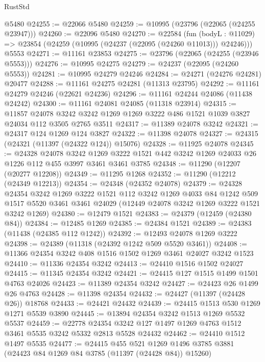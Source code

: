 \begin{lexlean}{RustStd}
\begin{coremodule}
    @5480
@24255 := @22066 @5480
@24259 := @10995 (@23796 (@22065 (@24255 @23947)))
@24260 := @22096 @5480
@24270 := @22584
    (fun (bodyL : @11029) => @23854 (@24259 (@10995 (@24237 (@22095 (@24260 @11013))) @24246)))
    @5553
@24271 := @11161 @23853
@24275 := @23796 (@22065 (@24255 (@23946 @5553)))
@24276 := @10995 @24275
@24279 := @24237 (@22095 (@24260 @5553))
@24281 := @10995 @24279 @24246
@24284 := @24271 (@24276 @24281) @20477
@24288 := @11161 @24275 @24281 (@11313 @23795)
@24292 := @11161 @24279 @24246 (@22621 @24236)
@24296 := @11161 @24244 @24086 (@11438 @24242)
@24300 := @11161 @24081 @24085 (@11318 @23914)
@24315 := @11857
    @24078
    @3242
    @3242
    @1269
    @1269
    @3222
    @486
    @1521
    @1039
    @3827
    @24034
    @112
    @3505
    @2765
    @3511
@24317 := @11389 @24078 @3242
@24321 := @24317 @124 @1269 @124 @3827
@24322 := @11398 @24078
@24327 := @24315 (@24321 (@11397 (@24322 @124)) @15076)
@24328 := @11925 @24078
@24345 := @24328
    @24078
    @3242
    @1269
    @3222
    @1521
    @442
    @3242
    @1269
    @24033
    @26
    @1226
    @112
    @455
    @3997
    @3461
    @3461
    @3785
@24348 := @11290 (@12207 (@20277 @12208))
@24349 := @11295 @1268
@24352 := @11290 (@12212 (@24349 @12213))
@24354 := @24348 (@24352 @24078)
@24379 := @24328
    @24354
    @3242
    @1269
    @3222
    @1521
    @112
    @3242
    @1269
    @4033
    @84
    @1242
    @509
    @1517
    @5520
    @3461
    @3461
    @24029
    (@12449 @24078 @3242 @1269 @3222 @1521 @3242 @1269)
@24380 := @12479 @1521
@24383 := @24379 (@12459 (@24380 @84))
@24384 := @12485 @1269
@24385 := @24384 @1521
@24389 := @24383 (@11438 (@24385 @112 @1242))
@24392 := @12493 @24078 @1269 @3222
@24398 := @24389 (@11318 (@24392 @1242 @509 @5520 @3461))
@24408 := @11366 @24354 @3242 @408 @1516 @1502 @1269 @3461 @24027 @3242 @1523
@24410 := @11336 @24354 @3242
@24413 := @24410 @1516 @1502 @24027
@24415 := @11345 @24354 @3242
@24421 := @24415 @127 @1515 @1499 @1501 @4763 @24026
@24423 := @11389 @24354 @3242
@24427 := @24423 @26 @1499 @26 @4763
@24428 := @11398 @24354
@24432 := @24427 (@11397 (@24428 @26)) @18768
@24433 := @24421 @24432
@24439 := @24415 @1513 @530 @1269 @1271 @5539 @3890
@24445 := @13894 @24354 @3242 @1513 @1269 @5532 @5537
@24459 := @22778
    @24354
    @3242
    @127
    @1497
    @1269
    @4763
    @1512
    @3461
    @5535
    @3242
    @5332
    @2813
    @5528
    @24432
@24462 := @24410 @1512 @1497 @5535
@24477 := @24415
    @455
    @521
    @1269
    @1496
    @3785
    @3881
    (@24423 @84 @1269 @84 @3785 (@11397 (@24428 @84)) @15260)

\end{coremodule}
\end{lexlean}
